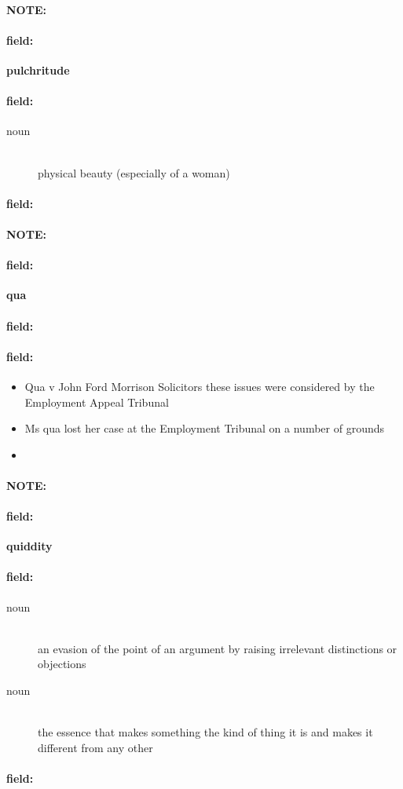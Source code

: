 \documentclass[12pt]{article}
\newenvironment{note}{\paragraph{NOTE:}}{}
\newenvironment{field}{\paragraph{field:}}{}
\begin{document}
\begin{note}
\begin{field}
\textbf{\large pulchritude}
\end{field}


\begin{field}
\begin{description}
\item[noun] \hfill \\ 
physical beauty (especially of a woman)

\end{description}
\end{field}

\begin{field}
\end{field}
\end{note}
\begin{note}
\begin{field}
\textbf{\large qua}
\end{field}


\begin{field}
\end{field}

\begin{field}
\begin{itemize}
\item Qua v John Ford Morrison Solicitors these issues were considered by the Employment Appeal Tribunal
\item Ms qua lost her case at the Employment Tribunal on a number of grounds
\item 
\end{itemize}
\end{field}
\end{note}
\begin{note}
\begin{field}
\textbf{\large quiddity}
\end{field}


\begin{field}
\begin{description}
\item[noun] \hfill \\ 
an evasion of the point of an argument by raising irrelevant distinctions or objections

\item[noun] \hfill \\ 
the essence that makes something the kind of thing it is and makes it different from any other

\end{description}
\end{field}

\begin{field}
\end{field}
\end{note}
\end{document}

